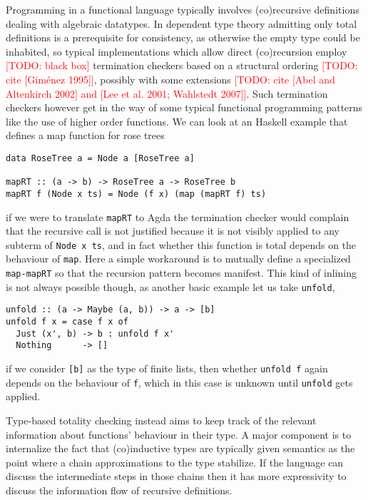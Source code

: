 \documentclass{book}
\newcommand{\TODO}[1]{\textcolor{red}{[TODO: #1]}}
\begin{document}
Programming in a functional language typically
involves (co)recursive definitions dealing with algebraic datatypes.
In dependent type theory admitting only total definitions is a
prerequisite for consistency, as otherwise the empty type could be
inhabited, so typical implementations which allow direct (co)recursion
employ \TODO{black box} termination checkers based on a structural
ordering \TODO{cite [Giménez 1995]}, possibly with some extensions
\TODO{cite [Abel and Altenkirch 2002] and [Lee et al. 2001; Wahlstedt
    2007]}.
Such termination checkers however get in the way of some typical
functional programming patterns like the use of higher order functions.
We can look at an Haskell example that defines a map function
for rose trees
\begin{verbatim}
data RoseTree a = Node a [RoseTree a]

mapRT :: (a -> b) -> RoseTree a -> RoseTree b
mapRT f (Node x ts) = Node (f x) (map (mapRT f) ts)
\end{verbatim}
if we were to translate \verb|mapRT| to Agda the termination checker
would complain that the recursive call is not justified because it is
not visibly applied to any subterm of \verb|Node x ts|, and in fact
whether this function is total depends on the behaviour of \verb|map|.
Here a simple workaround is to mutually define a specialized
\verb|map-mapRT| so that the recursion pattern becomes manifest.
This kind of inlining is not always possible though, as another basic
example let us take \verb|unfold|,
\begin{verbatim}
unfold :: (a -> Maybe (a, b)) -> a -> [b]
unfold f x = case f x of
  Just (x', b) -> b : unfold f x'
  Nothing      -> []
\end{verbatim}
if we consider \verb|[b]| as the type of finite lists, then whether
\verb|unfold f| again depends on the behaviour of \verb|f|, which in
this case is unknown until \verb|unfold| gets applied.

Type-based totality checking instead aims to keep track of the
relevant information about functions' behaviour in their type. A
major component is to internalize the fact that (co)inductive types
are typically given semantics as the point where a chain
approximations to the type stabilize.
If the language can discuss the intermediate steps in those chains
then it has more expressivity to discuss the information flow of
recursive definitions.
\end{document}
